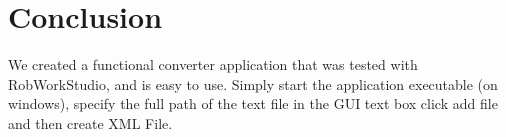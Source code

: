 \section{Conclusion}
\label{sec:conclusion}

We created a functional converter application that was tested with RobWorkStudio, and is easy to use. Simply start the application executable (on windows), specify the full path of the text file in the GUI text box click add file and then create XML File.